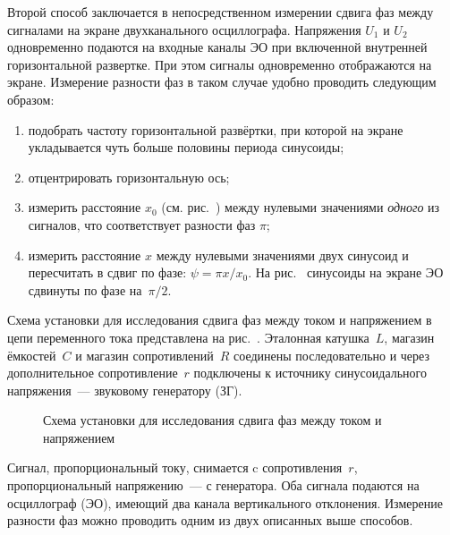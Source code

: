 Второй способ заключается в непосредственном измерении сдвига 
фаз между сигналами на экране двухканального осциллографа.
Напряжения $U_1$ и $U_2$ одновременно подаются на входные каналы ЭО
при включенной внутренней горизонтальной развертке. При этом
сигналы одновременно отображаются на экране.
Измерение разности фаз в таком случае удобно проводить следующим образом:
\begin{enumerate}[label=\arabic*),itemsep=0pt]
    \item подобрать частоту горизонтальной развёртки, при которой на экране 
    укладывается чуть больше половины периода синусоиды;
    \item отцентрировать горизонтальную ось;
    \item измерить расстояние $x_0$ (см. рис.~) между нулевыми значениями 
    \emph{одного} из сигналов, что соответствует разности фаз $\pi$;
    \item измерить расстояние $x$ между нулевыми значениями двух синусоид 
    и пересчитать в сдвиг по фазе: $\psi=\pi x/x_0$. На рис.~ 
    синусоиды на экране ЭО сдвинуты по фазе на~$\pi/2$.
\end{enumerate}

\experiment 
Схема установки для исследования сдвига фаз между током и напряжением 
в цепи переменного тока представлена на рис.~. Эталонная катушка~$L$, 
магазин ёмкостей~$C$ и магазин сопротивлений~$R$ соединены последовательно 
и через дополнительное сопротивление~$r$ подключены к источнику 
синусоидального напряжения~--- звуковому генератору (ЗГ).

\begin{figure}[hb]
    \centering\small
    \caption{Схема установки для исследования сдвига фаз между током и
        напряжением}
\end{figure}

Сигнал, пропорциональный току, снимается c сопротивления~$r$, 
пропорциональный напряжению~--- с генератора. Оба сигнала подаются 
на осциллограф (ЭО), имеющий два канала вертикального 
отклонения. Измерение разности фаз можно проводить одним из двух
описанных выше способов.




